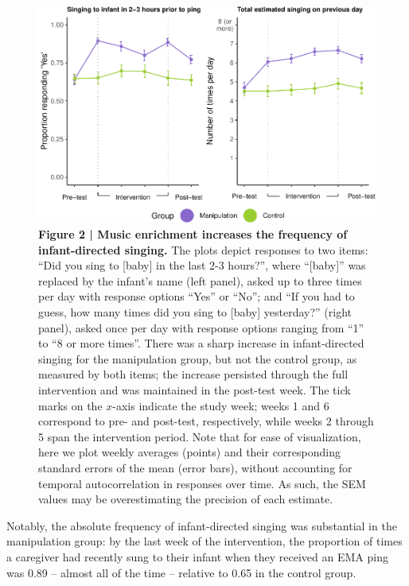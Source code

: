 \documentclass[
]{article}
\begin{document}
\begin{figure}[p]
\includegraphics{MIPH_childdev_files/figure-latex/fig2-1} \caption{\textbf{Figure 2 | Music enrichment increases the frequency of infant-directed singing.} The plots depict responses to two items: ``Did you sing to [baby] in the last 2-3 hours?'', where ``[baby]'' was replaced by the infant's name (left panel), asked up to three times per day with response options ``Yes'' or ``No''; and ``If you had to guess, how many times did you sing to [baby] yesterday?'' (right panel), asked once per day with response options ranging from ``1'' to ``8 or more times''. There was a sharp increase in infant-directed singing for the manipulation group, but not the control group, as measured by both items; the increase persisted through the full intervention and was maintained in the post-test week. The tick marks on the $x$-axis indicate the study week; weeks 1 and 6 correspond to pre- and post-test, respectively, while weeks 2 through 5 span the intervention period. Note that for ease of visualization, here we plot weekly averages (points) and their corresponding standard errors of the mean (error bars), without accounting for temporal autocorrelation in responses over time. As such, the SEM values may be overestimating the precision of each estimate.}\label{fig:fig2}
\end{figure}

Notably, the absolute frequency of infant-directed singing was
substantial in the manipulation group: by the last week of the
intervention, the proportion of times a caregiver had recently sung to
their infant when they received an EMA ping was 0.89 -- almost all of
the time -- relative to 0.65 in the control group.
\end{document}
